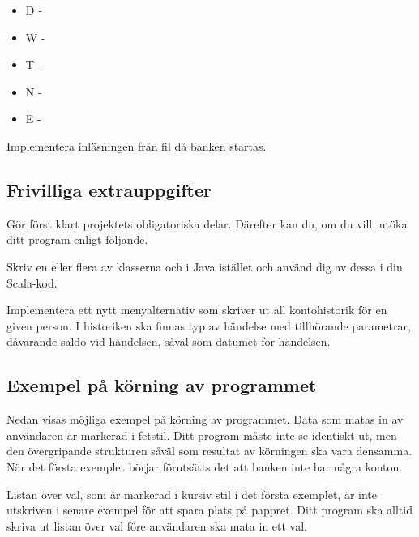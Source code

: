 \begin{itemize}
\item D - 
\item W - 
\item T - 
\item N - 
\item E - 
\end{itemize}

\Subtask Implementera inläsningen från fil då banken startas.


\subsection{Frivilliga extrauppgifter}

Gör först klart projektets obligatoriska delar. Därefter kan du, om du vill, utöka ditt
program enligt följande.

\Task Skriv en eller flera av klasserna  och  i Java istället och använd dig av dessa i din Scala-kod.

\Task	Implementera ett nytt menyalternativ som skriver ut all kontohistorik för en given person. I historiken ska finnas typ av händelse med tillhörande parametrar, dåvarande saldo vid händelsen, såväl som datumet för händelsen.

\subsection{Exempel på körning av programmet}

Nedan visas möjliga exempel på körning av programmet. Data som matas in av användaren är markerad i fetstil.
Ditt program måste inte se identiskt ut, men den övergripande strukturen såväl som resultat av körningen ska vara densamma.
När det första exemplet börjar förutsätts det att banken inte har några konton.

Listan över val, som är markerad i kursiv stil i det första exemplet, är inte utskriven i senare exempel för att spara plats på pappret. Ditt program ska alltid skriva ut listan över val före användaren ska mata in ett val.

\newenvironment{exampleblock}
	{\begin{minipage}{\columnwidth}
	 - - - - - - - - - - - - - - - - - - - - - - - - - - -\\}
	{\end{minipage}}

